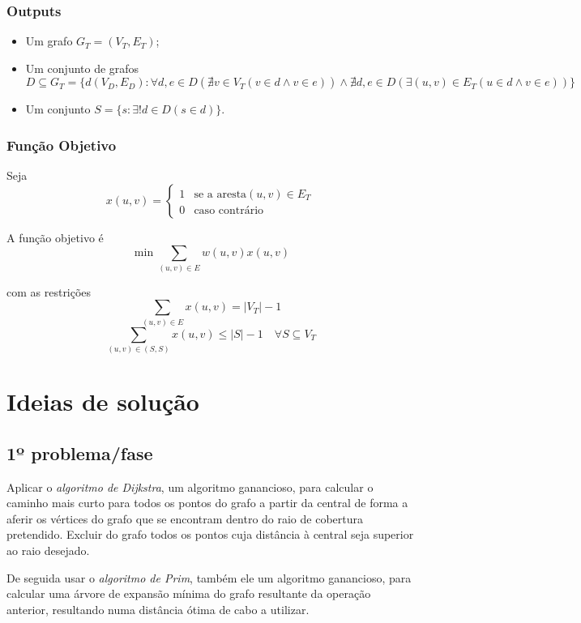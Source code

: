 \documentclass[a4paper,12pt,titlepage]{article}
\begin{document}
\subsubsection*{Outputs}
\begin{itemize}
\item Um grafo $G_T = ( V_T,E_T )$;
\item Um conjunto de grafos $D \subseteq G_T = \{d(V_D,E_D): \forall d,e \in D(\nexists v \in V_T(v \in d \land v \in e)) \land \nexists d,e\in D(\exists(u,v) \in E_T(u \in d \land v \in e)) \}$
\item Um conjunto $S = \{s : \exists! d \in D(s \in d)\}$.
\end{itemize}

\subsubsection*{Função Objetivo}
Seja $$x(u,v) = \begin{cases}
1 & \text{se a aresta} (u,v) \in E_T\\
0 & \text{caso contrário} 
\end{cases}$$

A função objetivo é\cite{ieor_mst}
$$\min \sum_{(u,v)\in E} w(u,v)x(u,v)$$

com as restrições 
$$\sum_{(u,v)\in E} x(u,v) = |V_T| - 1$$
$$\sum_{(u,v)\in (S,S)} x(u,v) \leq |S| - 1 \quad \forall S \subseteq V_T$$
\linebreak
\linebreak
\linebreak
\linebreak
\section{Ideias de solução}
\subsection{1º problema/fase}
Aplicar o \emph{algoritmo de Dijkstra}, um algoritmo ganancioso, para calcular o caminho mais curto para todos os pontos do grafo a partir da central de forma a aferir os vértices do grafo que se encontram dentro do raio de cobertura pretendido. Excluir do grafo todos os pontos cuja distância à central seja superior ao raio desejado.

De seguida usar o \emph{algoritmo de Prim}, também ele um algoritmo ganancioso, para calcular uma árvore de expansão mínima do grafo resultante da operação anterior, resultando numa distância ótima de cabo a utilizar.
\end{document}
